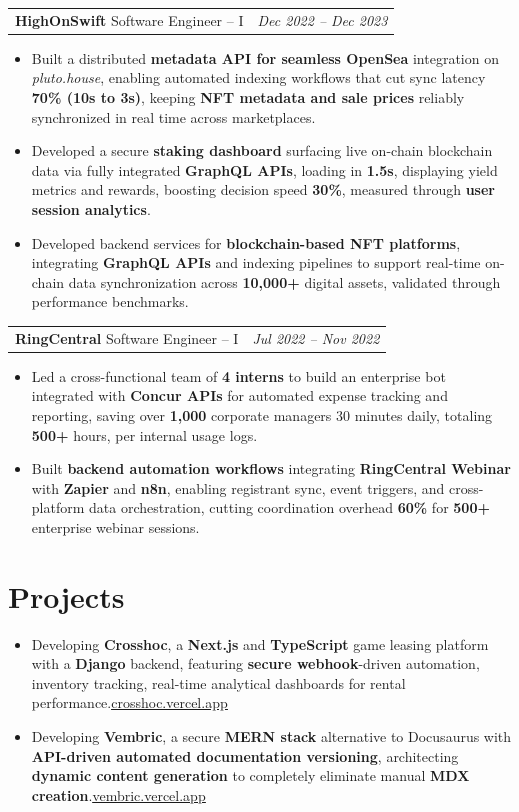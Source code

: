 \documentclass[letterpaper, 10pt]{article}
\makeatletter
\newcommand{\myhref}[2]{\href{#1}{\color{accent}\underline{#2}}}
\newcommand{\workEntry}[3]{%
  \begin{tabular*}{\textwidth}[t]{l@{\extracolsep{\fill}}r}
    \textbf{#1} \textbar{} \small #3 & \small\textit{#2}
  \end{tabular*}%
  \vspace{-2pt}%
}
\newcommand{\bi}[1]{\item\small #1}
\makeatother
\begin{document}
\vspace{2pt}

\workEntry{HighOnSwift}{Dec 2022 -- Dec 2023}{Software Engineer -- I}
\begin{itemize}
  \bi{Built a distributed \textbf{metadata API for seamless OpenSea} integration on \textit{pluto.house}, enabling automated indexing workflows that cut sync latency \textbf{70\% (10s to 3s)}, keeping \textbf{NFT metadata and sale prices} reliably synchronized in real time across marketplaces.}
  \bi{Developed a secure \textbf{staking dashboard} surfacing live on-chain blockchain data via fully integrated \textbf{GraphQL APIs}, loading in \textbf{1.5s}, displaying yield metrics and rewards, boosting decision speed \textbf{30\%}, measured through \textbf{user session analytics}.}
\bi{Developed backend services for \textbf{blockchain-based NFT platforms}, integrating \textbf{GraphQL APIs} and indexing pipelines to support real-time on-chain data synchronization across \textbf{10,000+} digital assets, validated through performance benchmarks.}
\end{itemize}

\vspace{2pt}

\workEntry{RingCentral}{Jul 2022 -- Nov 2022}{Software Engineer -- I}
\begin{itemize}
  \bi{Led a cross-functional team of \textbf{4 interns} to build an enterprise bot integrated with \textbf{Concur APIs} for automated expense tracking and reporting, saving over \textbf{1,000} corporate managers 30 minutes daily, totaling \textbf{500+} hours, per internal usage logs.}
\bi{Built \textbf{backend automation workflows} integrating \textbf{RingCentral Webinar} with \textbf{Zapier} and \textbf{n8n}, enabling registrant sync, event triggers, and cross-platform data orchestration, cutting coordination overhead \textbf{60\%} for \textbf{500+} enterprise webinar sessions.}
\end{itemize}

\section{Projects}

\begin{itemize}
  \bi{Developing \textbf{Crosshoc}, a \textbf{Next.js} and \textbf{TypeScript} game leasing platform with a \textbf{Django} backend, featuring \textbf{secure webhook}-driven automation, inventory tracking, real-time analytical dashboards for rental performance.\hfill\myhref{https://crosshoc.vercel.app}{crosshoc.vercel.app}}
  \bi{Developing \textbf{Vembric}, a secure \textbf{MERN stack} alternative to Docusaurus with \textbf{API-driven automated documentation versioning}, architecting \textbf{dynamic content generation} to completely eliminate manual \textbf{MDX creation}.\hfill\myhref{https://vembric.vercel.app}{vembric.vercel.app}}
\end{itemize}
\end{document}

